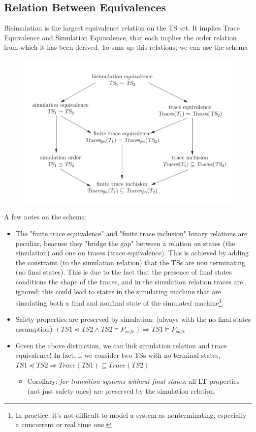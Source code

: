 \documentclass{article}
\begin{document}
			\subsection{Relation Between Equivalences}
				Bisimulation is the largest equivalence relation on the TS set. It implies Trace Equivalence and Simulation Equivalence, that each implies the order relation from which it has been derived. To sum up this relations, we can use the schema
				\begin{figure}[H]
					\centering
					\includegraphics[width = \textwidth]{./images/Relations.png}
				\end{figure}
				A few notes on the schema:
				\begin{itemize}
					\item The "finite trace equivalence" and "finite trace inclusion" binary relations are peculiar, beacuse they "bridge the gap" between a relation on states (the simulation) and one on traces (trace equivalence). This is achieved by adding the constraint (to the simulation relation) that the TSs are non terminating (no final states). This is due to the fact that the presence of final states conditions the shape of the traces, and in the simulation relation traces are ignored; this could lead to states in the simulating machine that are simulating both a final and nonfinal state of the simulated machine\footnote{In practice, it's not difficult to model a system as nonterminating, especially a cuncurrent or real time one.}.
					\item Safety properties are preserved by simulation: (always with the no-final-states assumption) $(TS1 \preceq TS2 \wedge TS2 \models P_{safe}) \Rightarrow TS1 \models P_{safe} $
					\item Given the above distinction, we can link simulation relation and trace equivalence! In fact, if we consider two TSs with no terminal states, $TS1 \preceq TS2 \Rightarrow Trace(TS1) \subseteq Trace(TS2)$
						\begin{itemize}
							\item Corollary: \emph{for transition systems without final states}, all LT properties (not just safety ones) are preserved by the simulation relation.
						\end{itemize}
				\end{itemize}
			
\end{document}

